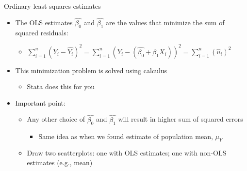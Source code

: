 \begin{frame}{Ordinary least squares estimates}
	\begin{itemize}
	\item The OLS estimates $\hat{\beta_{0}}$ and $\hat{\beta_{1}}$ are the values that minimize the sum of squared residuals:
		\begin{itemize}
		\item $\sum_{i=1}^{n} (Y_{i} - \hat{Y_{i}})^{2} = \sum_{i=1}^{n} (Y_{i} - (\hat{\beta_{0}} + \hat{\beta_{1}}X_{i}))^{2} = \sum_{i=1}^{n} (\hat u_{i})^{2}$
		\end{itemize}
		\vspace{2mm}		
	\item This minimization problem is solved using calculus
		\begin{itemize}
		\item Stata does this for you
		\end{itemize}
	\item Important point:
		\begin{itemize}
		\item Any other choice of $\hat{\beta_{0}}$ and $\hat{\beta_{1}}$ will result in higher sum of squared errors
			\begin{itemize}
			\item Same idea as when we found estimate of population mean, $\mu_{Y}$
			\end{itemize}
		\item Draw two scatterplots: one with OLS estimates; one with non-OLS estimates (e.g., mean)
		\end{itemize}
	\end{itemize}
\end{frame}



